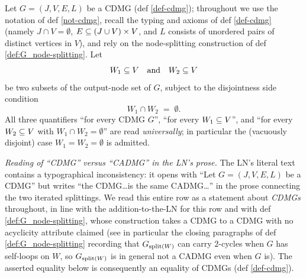 \documentclass[main]{subfiles}
\begin{document}
\begin{Lem}
    Let $G = (J, V, E, L)$ be a CDMG (def \ref{def-cdmg}); throughout we use the notation of def \ref{not-cdmg}, recall the typing and axioms of def \ref{def-cdmg} (namely $J \cap V = \emptyset$, $E \subseteq (J \cup V) \times V$, and $L$ consists of unordered pairs of distinct vertices in $V$), and rely on the node-splitting construction of def \ref{def:G_node-splitting}. Let
    \[ W_1 \subseteq V \quad\text{and}\quad W_2 \subseteq V \]
    be two subsets of the output-node set of $G$, subject to the disjointness side condition
    \[ W_1 \cap W_2 \;=\; \emptyset. \]
    All three quantifiers ``for every CDMG $G$'', ``for every $W_1 \subseteq V$'', and ``for every $W_2 \subseteq V$ with $W_1 \cap W_2 = \emptyset$'' are read \emph{universally}; in particular the (vacuously disjoint) case $W_1 = W_2 = \emptyset$ is admitted.

    \emph{Reading of ``CDMG'' versus ``CADMG'' in the LN's prose.}
    The LN's literal text contains a typographical inconsistency: it opens with ``Let $G = (J, V, E, L)$ be a CDMG'' but writes ``the CDMG\ldots is the same CADMG\ldots'' in the prose connecting the two iterated splittings. We read this entire row as a statement about \emph{CDMGs} throughout, in line with the addition-to-the-LN for this row and with def \ref{def:G_node-splitting}, whose construction takes a CDMG to a CDMG with no acyclicity attribute claimed (see in particular the closing paragraphs of def \ref{def:G_node-splitting} recording that $G_{\mathrm{split}(W)}$ can carry $2$-cycles when $G$ has self-loops on $W$, so $G_{\mathrm{split}(W)}$ is in general not a CADMG even when $G$ is). The asserted equality below is consequently an equality of CDMGs (def \ref{def-cdmg}).


\end{Lem}
\end{document}
